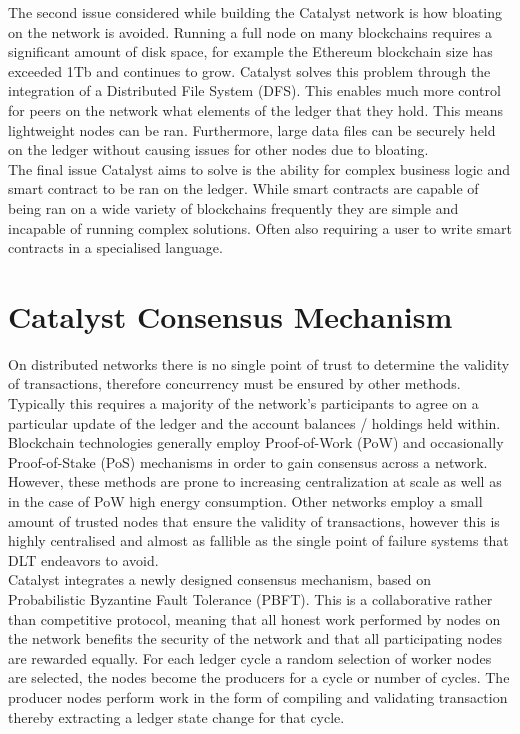 \documentclass{article}
\begin{document}
The second issue considered while building the Catalyst network is how bloating on the network is avoided. Running a full node on many blockchains requires a significant amount of disk space, for example the Ethereum blockchain size has exceeded 1Tb \cite{EthBloat} and continues to grow. Catalyst solves this problem through the integration of a Distributed File System (DFS). This enables much more control for peers on the network what elements of the ledger that they hold. This means lightweight nodes can be ran. Furthermore, large data files can be securely held on the ledger without causing issues for other nodes due to bloating. \\

The final issue Catalyst aims to solve is the ability for complex business logic and smart contract to be ran on the ledger. While smart contracts are capable of being ran on a wide variety of blockchains frequently they are simple and incapable of running complex solutions. Often also requiring a user to write smart contracts in a specialised language. \\


\section{Catalyst Consensus Mechanism}

On distributed networks there is no single point of trust to determine the validity of transactions, therefore concurrency must be ensured by other methods. Typically this requires a majority of the network's participants to agree on a particular update of the ledger and the account balances / holdings held within. Blockchain technologies generally employ Proof-of-Work (PoW) and occasionally Proof-of-Stake (PoS) mechanisms in order to gain consensus across a network. However, these methods are prone to increasing centralization at scale as well as in the case of PoW high energy consumption. Other networks employ a small amount of trusted nodes that ensure the validity of transactions, however this is highly centralised and almost as fallible as the single point of failure systems that DLT endeavors to avoid. \\

Catalyst integrates a newly designed consensus mechanism, based on Probabilistic Byzantine Fault Tolerance (PBFT).  This is a collaborative rather than competitive protocol, meaning that all honest work performed by nodes on the network benefits the security of the network and that all participating nodes are rewarded equally. For each ledger cycle a random selection of worker nodes are selected, the nodes become the producers for a cycle or number of cycles. The producer nodes perform work in the form of compiling and validating transaction thereby extracting a ledger state change for that cycle. \\
\end{document}
